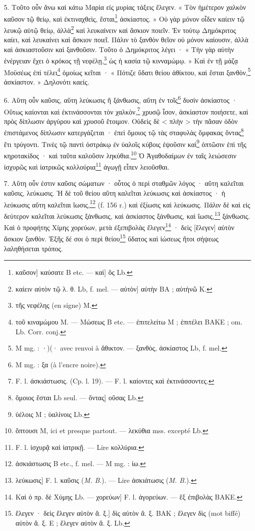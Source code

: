 \documentclass[landscape, a4paper, 11pt, oneside, polutonikogreek, french]{article}
\begin{document}
5. Τοῦτο οὖν ἄνω καὶ κάτω Μαρία εἰς μυρίας τάξεις ἔλεγεν. « Τὸν ἡμέτερον χαλκὸν καῦσον τῷ θείῳ, καὶ ἐκτιναχθεὶς, ἔσται\footnote{καῦσον] καύσατε B etc. --- καὶ] ὃς Lb.} ἀσκίαστος. » Οὐ γὰρ μόνον οἶδεν καίειν τῷ λευκῷ αὐτῷ θείῳ, ἀλλὰ\footnote{καίειν αὐτὸν τῷ λ. θ. Lb, f. mel. --- αὐτὸν] αὐτὴν BA ; αὐτὴνῶ K.} καὶ λευκαίνειν καὶ ἄσκιον ποιεῖν. Ἐν τούτῳ Δημόκριτος καίει, καὶ λευκαίνει καὶ ἄσκιον ποιεῖ. Πάλιν τὸ ξανθὸν θεῖον οὐ μόνον καίουσιν, ἀλλὰ καὶ ἀσκιαστοῦσιν καὶ ξανθοῦσιν. Τοῦτο ὁ Δημόκριτος λέγει · « Τὴν γὰρ αὐτὴν ἐνέργειαν ἔχει ὁ κρόκος τῇ νεφέλῃ,\footnote{τῆς νεφέλης (en signe) M.} ὡς ἡ κασία τῷ κινναμώμῳ. » Καὶ ἐν τῇ μάζᾳ Μοϋσέως ἐπὶ τέλει\footnote{τοῦ κιναμώμου M. --- Mώσεως B etc. --- ἐπιτελείτω M ; ἐπιτέλει BAKE ; om. Lb. Corr. conj.} ὁμοίως κεῖται · « Πότιζε ὕδατι θείου ἀθίκτου, καὶ ἔσται ξανθὸν,\footnote{M mg. : ·)(· avec renvoi à ἄθικτον. --- ξανθὸς, ἀσκίαστος Lb, f. mel.} ἀσκίαστον. » Δηλονότι καείς.

6. Αὕτη οὖν καῦσις, αὕτη λεύκωσις ἢ ξάνθωσις, αὕτη ἐν τοῖς\footnote{M mg. : ξα (à l'encre noire).} δυσὶν ἀσκίαστος · Οὕτως καίονται καὶ ἐκτινάσσονται τὸν χαλκὸν,\footnote{F. l. ἀσκιάστωσις. (Cp. l. 19). --- F. l. καίοντες καὶ ἐκτινάσσοντες.} χρυσῷ ἶσον, ἀσκίαστον ποιήσετε, καὶ πρὸς δίπλωσιν ἀργύρου καὶ χρυσοῦ ἔτοιμον. Οὐδεὶς δὲ < πλὴν > τὴν πᾶσαν ὁδὸν ἐπιστάμενος δίπλωσιν κατεργάζεται · ἐπεὶ ὅμοιος τῷ τὰς σταφυλὰς ὄμφακας ὄντας\footnote{ὅμοιος ἔσται Lb seul. --- ὄντας] οὔσας Lb.} ἔτι τρύγοντι. Τινὲς τῷ παντὶ ὀστράκῳ ἐν ὑαλοῖς κύβοις ἑψοῦσιν καὶ\footnote{ὑέλοις M ; ὑαλίνοις Lb.} ὀπτῶσιν ἐπὶ τῆς κηροτακίδος · καὶ ταῦτα καλοῦσιν ληκύθια.\footnote{ὄπτουσι M, ici et presque partout. --- λεκύθια mss. excepté Lb.} Ὁ Ἀγαθοδαίμων ἐν ταῖς λειώσεσιν ἰσχυρῶς καὶ ἰατρικῶς κολλούρια\footnote{F. l. ἰσχυρᾷ καὶ ἰατρικῇ. --- Lire κολλύρια.} ἀγωγῇ εἶπεν λειοῦσθαι.

7. Αὕτη οὖν ἐστιν καῦσις σώματων · οὗτος ὁ περὶ σταθμῶν λόγος · αὕτη καλεῖται καῦσις, λεύκωσις. Ἡ δὲ τοῦ θείου αὕτη καλεῖται λεύκωσις καὶ ἀσκίαστος · ἡ λεύκωσις αὕτη καλεῖται ἴωσις,\footnote{ἀσκιάστωσις B etc., f. mel. --- M mg. : ἰω.} (f. 156 r.) καὶ ἐξίωσις καὶ λεύκωσις. Πάλιν δὲ καὶ εἰς δεύτερον καλεῖται λεύκωσις ξάνθωσις, καὶ ἀσκίαστος ξάνθωσις, καὶ ἴωσις,\footnote{λεύκωσις] F. l. καῦσις (\emph{M. B.}). --- Lire ἀσκιάτωσις (\emph{M. B.}).} ξάνθωσις. Καὶ ὁ προφήτης Χίμης χορεύων, μετὰ ἐξεπιβολὰς ἔλεγεν\footnote{Καὶ ὁ πρ. δὲ Χύμης Lb. --- χορεύων] F. l. ἀγορεύων. --- ἓξ ἐπιβολὰς BAKE.} · δεὶς [ἔλεγεν] αὐτὸν ἄσκιον ξανθὸν. Ἐξῆς δέ σοι ὁ περὶ θείου\footnote{ἔλεγεν · δεὶς ἔλεγεν αὐτὸν ἄ. ξ.] δὶς αὐτὸν ἄ. ξ. BAK ; ἔλεγεν δὶς (mot biffé) αὐτὸν ἄ. ξ. E ; ἔλεγεν αὐτὸν ἄ. ξ. Lb.} ὕδατος καὶ ἰώσεως ἤτοι σήψεως λαληθήσεται τρόπος.
\end{document}
